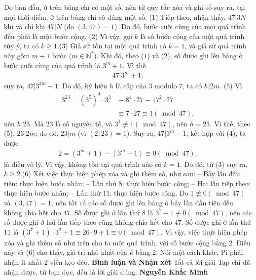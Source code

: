 \begin{multicols}{2}
	\vskip 0.05cm
	Do ban đầu, ở trên bảng chỉ có một số, nên từ quy tắc xóa và ghi số suy ra, tại mọi thời điểm, ở trên bảng chỉ có đúng một số.            \hfill ($1$)
	\vskip 0.05cm
	Tiếp theo, nhận thấy, $47|3N$  khi và chỉ khi $47|N$  (do $(3, 47) = 1$). Do đó, bước cuối cùng của mọi quá trình đều phải là một bước cộng. \hfill ($2$)
	\vskip 0.05cm
	Vì vậy, gọi $k$ là số bước cộng của một quá trình tùy ý, ta có $k \ge 1$.\hfill ($3$)
	\vskip 0.05cm
	Giả sử tồn tại một quá trình có $k = 1$, và giả sử quá trình này gồm $m + 1$ bước ($m \in \mathbb{N^*}$).
	\vskip 0.05cm
	Khi đó, theo ($1$) và ($2$), số được ghi lên bảng ở bước cuối cùng của quá trình là $3^m + 1$. Vì thế
	\begin{align*}
		47|{3^m} + 1; \tag{$4$}
	\end{align*}
	suy ra,  $47|{3^{2m}} - 1$. Do đó, ký hiệu $h$ là cấp của $3$ modulo $7$, ta có  $h|2m$. \hfill   ($5$)
	\vskip 0.05cm
	Vì
	\begin{align*}
		{3^{23}} = {\left( {{3^5}} \right)^4} \cdot {3^3} &\equiv {8^4} \cdot 27 \equiv {17^2} \cdot 27 \\
		&\equiv 7 \cdot 27 \equiv 1\left( {\bmod 47} \right),
	\end{align*}
	nên $h|23$.  Mà $23$ là số nguyên tố, và ${3^1}\not  \equiv 1\left( {\bmod 47} \right)$,  nên $h = 23$. Vì thế, theo ($5$),  $23|2m$; do đó, $23|m$  (vì $(2, 23) = 1$). Suy ra, $47|3^m-1$; kết hợp với ($4$), ta được
	\begin{align*}
		2 = \left( {{3^m} + 1} \right) - \left( {{3^m} - 1} \right) \equiv 0\left( {\bmod 47} \right),
	\end{align*}
	là điều vô lý.
	\vskip 0.05cm
	Vì vậy, không tồn tại quá trình nào có $k = 1$. Do đó, từ ($3$) suy ra, $k \ge 2$.\hfill      ($6$)
	\vskip 0.05cm
	Xét việc thực hiện phép xóa và ghi thêm số, như sau:
	\vskip 0.05cm
	-- Bảy lần đầu tiên: thực hiện bước nhân;
	\vskip 0.05cm
	-- Lần thứ $8$: thực hiện bước cộng;
	\vskip 0.05cm
	-- Hai lần tiếp theo: thực hiện bước nhân;
	\vskip 0.05cm
	-- Lần thứ $11$: thực hiện bước cộng.
	\vskip 0.05cm
	Do $1\not  \equiv 0\left( {\bmod 47} \right)$  và $(3, 47) = 1$, nên tất cả các số được ghi lên bảng ở bảy lần đầu tiên đều không chia hết cho $47$.
	\vskip 0.05cm
	Số được ghi ở lần thứ $8$ là  ${3^7} + 1\not  \equiv 0\left( {\bmod 47} \right)$, nên các số được ghi ở hai lần tiếp theo cũng không chia hết cho $47$.
	\vskip 0.05cm
	Số được ghi ở lần thứ $11$ là  $\left( {{3^7} + 1} \right) \cdot {3^2} + 1 \equiv 26 \cdot 9 + 1 \equiv 0\left( {\bmod 47} \right)$.
	\vskip 0.05cm
	Vì vậy, việc thực hiện phép xóa và ghi thêm số như trên cho ta một quá trình, với số bước cộng bằng $2$. Điều này và ($6$) cho thấy, giá trị nhỏ nhất của $k$ bằng $2$. Nói một cách khác, Pi phải nhận ít nhất $2$ viên kẹo dẻo.
	\vskip 0.05cm
	\textbf{\color{thachthuctoanhoc}Bình luận và Nhận xét}
	\vskip 0.05cm
	Tất cả lời giải Tạp chí đã nhận được, từ bạn đọc, đều là lời giải đúng.
	\vskip 0.05cm
	\hfill\textbf{\color{thachthuctoanhoc}Nguyễn Khắc Minh}
\end{multicols}
